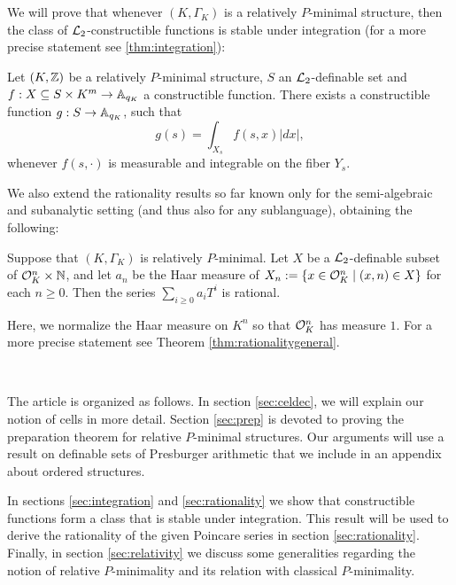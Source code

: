 \\\\
We will prove that whenever $(K, \Gamma_K)$ is a relatively $P$-minimal structure, then the class of $\Lm_2$-constructible functions is stable under integration (for a more precise statement see \ref{thm:integration}): 

\begin{thm*}
Let $(K, \Z)$ be a relatively $P$-minimal structure, $S$ an $\Lm_2$-definable set and $f: X \subseteq S\times K^m \to \AA_{q_K}$ a constructible function.  There exists a constructible function $g: S \to \AA_{q_K}$, such that
\[g(s) = \int_{X_s} f(s,x)|dx|,\]
whenever $f(s, \cdot)$ is measurable and integrable on the fiber $Y_s$.
\end{thm*}

We also extend the rationality results so far known only for the semi-algebraic \cite{denef-84} and subanalytic setting \cite{denef-vdd-88} (and thus also for any sublanguage), obtaining the following:

\begin{thm*}\label{thm:rationality}
Suppose that $(K,\Gamma_K)$ is relatively $P$-minimal. Let $X$ be a $\cL_2$-definable subset of $\cO_K^n\times \NN$, and let $a_n$ be the Haar measure of $X_n:=\{x\in \cO_K^n\mid (x,n)\in X\}$ for each $n\geq 0$. Then the series $\sum_{i\geq 0} a_i T^i$ is rational. 
\end{thm*}
Here, we normalize the Haar measure on $K^n$ so that $\cO_K^n$ has measure $1$. For a more precise statement see Theorem \ref{thm:rationalitygeneral}.  

\

The article is organized as follows. In section \ref{sec:celdec}, we will explain our notion of cells in more detail. Section \ref{sec:prep} is devoted to proving the preparation theorem for relative $P$-minimal structures.
Our arguments will use a result on definable sets of Presburger arithmetic that we include in an appendix about ordered structures. 

 In sections \ref{sec:integration} and \ref{sec:rationality} we show that constructible functions form a class that is stable under integration. This result will be used to derive the rationality of the given Poincare series in section \ref{sec:rationality}.  Finally, in section \ref{sec:relativity} we discuss some generalities regarding the notion of relative $P$-minimality and its relation with classical $P$-minimality. 




